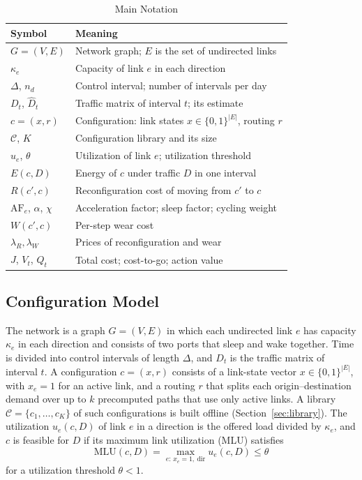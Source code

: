 \documentclass[preprint,12pt]{elsarticle}
\begin{document}
\begin{table}[t]
\centering
\caption{Main Notation}
\label{tab:notation}
\footnotesize
\setlength{\tabcolsep}{3pt}
\begin{tabular}{@{}p{1.85cm}p{6.5cm}@{}}
\toprule
Symbol & Meaning \\
\midrule
$G=(V,E)$ & Network graph; $E$ is the set of undirected links \\
$\kappa_e$ & Capacity of link $e$ in each direction \\
$\Delta$, $n_d$ & Control interval; number of intervals per day \\
$D_t$, $\hat D_t$ & Traffic matrix of interval $t$; its estimate \\
$c=(x,r)$ & Configuration: link states $x\in\{0,1\}^{|E|}$, routing $r$ \\
$\mathcal{C}$, $K$ & Configuration library and its size \\
$u_e$, $\theta$ & Utilization of link $e$; utilization threshold \\
$E(c,D)$ & Energy of $c$ under traffic $D$ in one interval \\
$R(c',c)$ & Reconfiguration cost of moving from $c'$ to $c$ \\
$\mathrm{AF}_e$, $\alpha$, $\chi$ & Acceleration factor; sleep factor; cycling weight \\
$W(c',c)$ & Per-step wear cost \\
$\lambda_R,\lambda_W$ & Prices of reconfiguration and wear \\
$J$, $V_t$, $Q_t$ & Total cost; cost-to-go; action value \\
\bottomrule
\end{tabular}
\end{table}

\subsection{Configuration Model}

The network is a graph $G=(V,E)$ in which each undirected link $e$ has capacity $\kappa_e$ in each direction and consists of two ports that sleep and wake together. Time is divided into control intervals of length $\Delta$, and $D_t$ is the traffic matrix of interval $t$. A configuration $c=(x,r)$ consists of a link-state vector $x\in\{0,1\}^{|E|}$, with $x_e=1$ for an active link, and a routing $r$ that splits each origin--destination demand over up to $k$ precomputed paths that use only active links. A library $\mathcal{C}=\{c_1,\dots,c_K\}$ of such configurations is built offline (Section~\ref{sec:library}). The utilization $u_e(c,D)$ of link $e$ in a direction is the offered load divided by $\kappa_e$, and $c$ is feasible for $D$ if its maximum link utilization (MLU) satisfies
\begin{equation}\label{eq:mlu}
\mathrm{MLU}(c,D)=\max_{e:\,x_e=1,\ \mathrm{dir}}u_e(c,D)\le\theta
\end{equation}
for a utilization threshold $\theta<1$.
\end{document}
